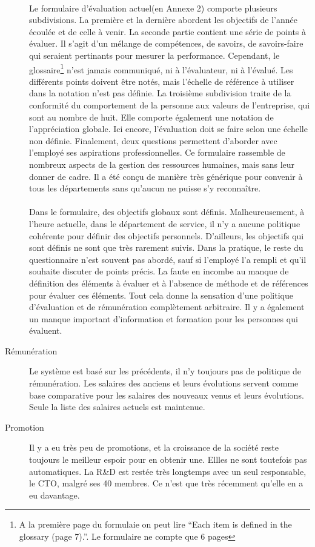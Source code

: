\begin{description}
\paragraph{}Le formulaire d'évaluation actuel(en Annexe 2) comporte plusieurs subdivisions. La première et la dernière abordent les objectifs de l'année écoulée et de celle à venir. La seconde partie contient une série de points à évaluer. Il s'agit d'un mélange de compétences, de savoirs, de savoirs-faire qui seraient pertinants pour mesurer la performance. Cependant, le glossaire\footnote{A la première page du formulaie on peut lire \enquote{Each item is defined in the glossary (page 7).}. Le formulaire ne compte que 6 pages} n'est jamais communiqué, ni à l'évaluateur, ni à l'évalué. Les différents points doivent être notés, mais l'échelle de référence à utiliser dans la notation n'est pas définie. La troisième subdivision traite de la conformité du comportement de la personne aux valeurs de l'entreprise, qui sont au nombre de huit. Elle comporte également une notation de l'appréciation globale. Ici encore, l'évaluation doit se faire selon une échelle non définie. Finalement, deux questions permettent d'aborder avec l'employé ses aspirations professionnelles. Ce formulaire rassemble de nombreux aspects de la gestion des ressources humaines, mais sans leur donner de cadre. Il a été conçu de manière très générique pour convenir à tous les départements sans qu'aucun ne puisse s'y reconnaître.

\paragraph{}Dans le formulaire, des objectifs globaux sont définis. Malheureusement, à l'heure actuelle, dans le département de service, il n'y a aucune politique cohérente pour définir des objectifs personnels. D'ailleurs, les objectifs qui sont définis ne sont que très rarement suivis. Dans la pratique, le reste du questionnaire n'est souvent pas abordé, sauf si l'employé l'a rempli et qu'il souhaite discuter de points précis. La faute en incombe au manque de définition des éléments à évaluer et à l'absence de méthode et de références pour évaluer ces éléments. Tout cela donne la sensation d'une politique d'évaluation et de rémunération complètement arbitraire. Il y a également un manque important d'information et formation pour les personnes qui évaluent.
  \item[Rémunération] Le système est basé sur les précédents, il n'y toujours pas de politique de rémunération. Les salaires des anciens et leurs évolutions servent comme base comparative pour les salaires des nouveaux venus et leurs évolutions. Seule la liste des salaires actuels est maintenue.
  
  \item[Promotion] Il y a eu très peu de promotions, et la croissance de la société reste toujours le meilleur espoir pour en obtenir une. Ellles ne sont toutefois pas automatiques. La R\&D est restée très longtemps avec un seul responsable, le CTO, malgré ses 40 membres. Ce n'est que très récemment qu'elle en a eu davantage.  
\end{description}

